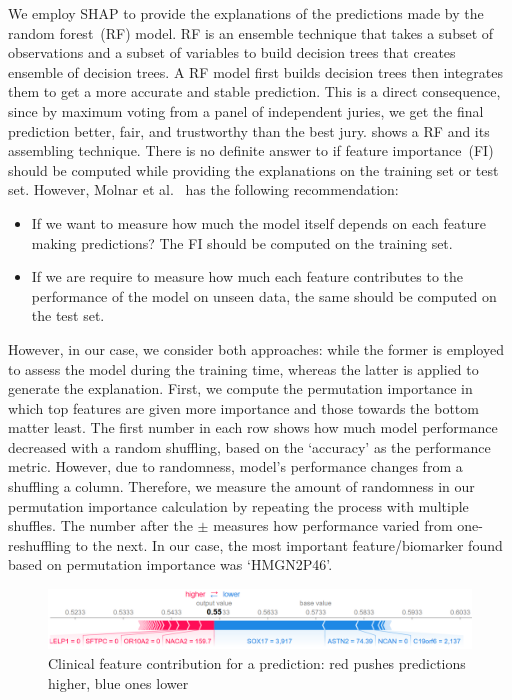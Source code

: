 \hspace*{3.5mm}We employ SHAP to provide the explanations of the predictions made by the random forest~(RF) model. RF is an ensemble technique that takes a subset of observations and a subset of variables to build decision trees that creates ensemble of decision trees. A RF model first builds decision trees then integrates them to get a more accurate and stable prediction. This is a direct consequence, since by maximum voting from a panel of independent juries, we get the final prediction better, fair, and trustworthy than the best jury.  shows a RF and its assembling technique. There is no definite answer to if feature importance~(FI) should be computed while providing the explanations on the training set or test set. However, Molnar et al.~\cite{molnar2019interpretable} has the following recommendation: 

\begin{itemize} [noitemsep]
    \item If we want to measure how much the model itself depends on each feature making predictions? The FI should be computed on the training set.
    \item If we are require to measure how much each feature contributes to the performance of the model on unseen data, the same should be computed on the test set. 
\end{itemize}

\hspace*{3.5mm} However, in our case, we consider both approaches: while the former is employed to assess the model during the training time, whereas the latter is applied to generate the explanation. First, we compute the permutation importance in which top features are given more importance and those towards the bottom matter least.
The first number in each row shows how much model performance decreased with a random shuffling, based on the `accuracy' as the performance metric. 
However, due to randomness, model's performance changes from a shuffling a column. Therefore, we measure the amount of randomness in our permutation importance calculation by repeating the process with multiple shuffles. The number after the $±$ measures how performance varied from one-reshuffling to the next. In our case, the most important feature/biomarker found based on permutation importance was `HMGN2P46'. %

\begin{figure}[h]
\centering
	\includegraphics[width=0.8\linewidth]{images/shap.png}
	\caption{Clinical feature contribution for a prediction: red pushes predictions higher, blue ones lower} 
	\label{fig:shap}
	\vspace{-2mm}
\end{figure}

